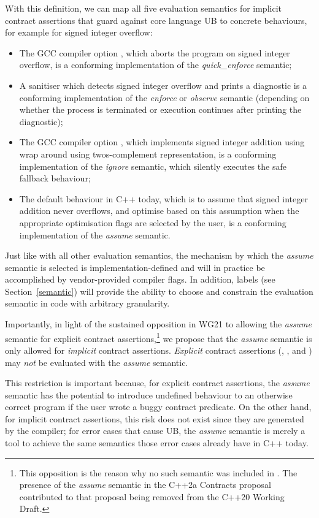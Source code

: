 With this definition, we can map all five evaluation semantics for implicit contract assertions that guard against core language UB to concrete behaviours, for example for signed integer overflow:
\begin{itemize}
\item The GCC compiler option , which aborts the program on signed integer overflow, is a conforming implementation of the \emph{quick_enforce} semantic;
\item A sanitiser which detects signed integer overflow and prints a diagnostic is a conforming
implementation of the \emph{enforce} or \emph{observe} semantic (depending on whether the
process is terminated or execution continues after printing the diagnostic);
\item The GCC compiler option , which implements signed integer addition using wrap around using twos-complement representation, is a conforming implementation of the \emph{ignore} semantic, which silently executes the safe fallback behaviour;
\item The default behaviour in C++ today, which is to assume that signed integer addition never overflows, and optimise based on this assumption when the appropriate optimisation flags are selected by the user, is a conforming implementation of the \emph{assume} semantic.
\end{itemize}
Just like with all other evaluation semantics, the mechanism by which the \emph{assume} semantic is selected is implementation-defined and will in practice be accomplished by vendor-provided compiler flags. In addition, labels (see Section~\ref{semantic}) will provide the ability to choose and constrain the evaluation semantic in code with arbitrary granularity.

Importantly, in light of the sustained opposition in WG21 to allowing the \emph{assume} semantic for explicit contract assertions,\footnote{This opposition is the reason why  no such semantic was included in \cite{P2900R14}. The presence of the \emph{assume} semantic in the C++2a Contracts proposal \cite{P0542R5} contributed to that proposal being removed from the C++20 Working Draft.} we propose that the \emph{assume} semantic is only allowed for \emph{implicit} contract assertions. \emph{Explicit} contract assertions (, , and ) may \emph{not} be evaluated with the \emph{assume} semantic.

This restriction is important because, for explicit contract assertions, the \emph{assume} semantic  has the potential to introduce undefined behaviour to an otherwise correct program if the user wrote a buggy contract predicate. On the other hand, for implicit contract assertions, this risk does not exist since they are generated by the compiler; for error cases that cause UB, the \emph{assume} semantic is merely a tool to achieve the same semantics those error cases already have in C++ today.

